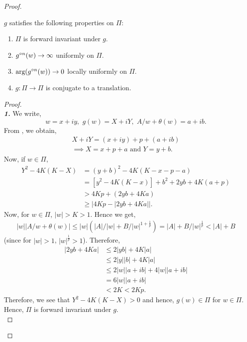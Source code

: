 \begin{proof}
\begin{lemma}
	\( g \) satisfies the following properties on \( \Pi \):
	\begin{enumerate}
		\item \(\Pi\) is forward invariant under \( g \).
		\item \( \gog[n](w)\to \infty \) uniformly on \( \Pi \).
		\item \( \arg(\gog[n](w))\to 0 \) locally uniformly on \( \Pi \).
		\item \( g:\Pi\to \Pi \) is conjugate to a translation.
	\end{enumerate}
\end{lemma}
\begin{proof}\text{}\\
	\noindent \textbf{\emph{1.}} We write, \[
		w=x+iy,\,\, g(w)=X+iY,\,\, A /w+\theta(w)=a+ib
	.\] 
	From , we obtain,
	\begin{align*}
		X+iY=(x+iy)+p+(a+ib)\\
	\implies X=x+p+a\text{ and }Y=y+b
	.\end{align*}
	Now, if \( w\in \Pi  \),
	\begin{align*}
		Y^2-4K(K-X)&=(y+b)^2-4K(K-x-p-a)\\
				   &=[y^2-4K(K-x)]+b^2+2yb+4K(a+p)\\
				   &> 4Kp+(2yb+4Ka)\\
				   &\ge |4Kp- |2yb+4Ka| |
	.\end{align*}
	Now, for \( w\in\Pi \), \( |w|>K>1 \). Hence we get,
	\begin{align}
		|w||A /w+\theta (w)|\le |w| (|A| /|w|+ B /|w|^{1+\frac{1}{p}})=|A|+B /|w|^{\frac{1}{p}}<|A|+B \label{eqn3.3}
	\end{align}
	(since for \( |w|>1 \), \( |w|^{\frac{1}{p}}>1 \)).  Therefore,
	\begin{align*}
		|2yb+4Ka|&\le 2|yb|	+4K|a|\\
				 &\le 2|y| |b|+4 K |a| \\
				 &\le 2|w| |a+ib| +4 |w| |a+ib| \\
				 &=6|w| |a+ib|\\
				 &<2K<2Kp
	.\end{align*}
	Therefore, we see that \( Y^2-4K(K-X)>0 \) and hence, \( g(w)\in \Pi \) for \( w\in \Pi \).
	Hence, \( \Pi \) is forward invariant under \( g \).\\
	\vspace{1pt}


\end{proof}
\end{proof}
